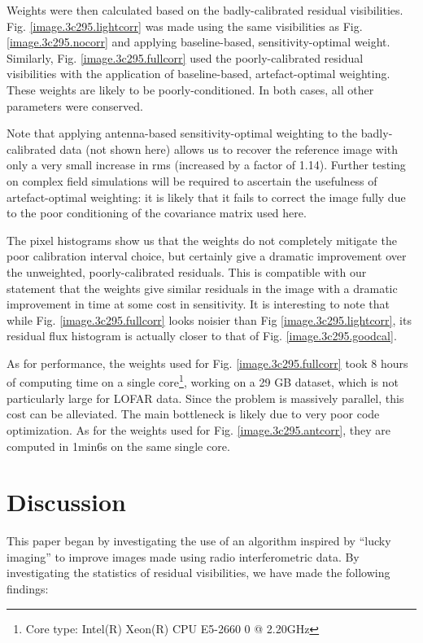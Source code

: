 \pg
Weights were then calculated based on the badly-calibrated residual visibilities. Fig. \ref{image.3c295.lightcorr} was made using the same visibilities as Fig. \ref{image.3c295.nocorr} and applying baseline-based, sensitivity-optimal weight. Similarly, Fig. \ref{image.3c295.fullcorr} used the poorly-calibrated residual visibilities with the application of baseline-based, artefact-optimal weighting. These weights are likely to be poorly-conditioned. In both cases, all other parameters were conserved.


\pg
Note that applying antenna-based sensitivity-optimal weighting to the badly-calibrated data (not shown here) allows us to recover the reference image with only a very small increase in rms (increased by a factor of 1.14). Further testing on complex field simulations will be required to ascertain the usefulness of artefact-optimal weighting: it is likely that it fails to correct the image fully due to the poor conditioning of the covariance matrix used here.

\pg
{The pixel histograms show us that the weights do not completely mitigate the poor calibration interval choice, but certainly give a dramatic improvement over the unweighted, poorly-calibrated residuals. This is compatible with our statement that the weights give similar residuals in the image with a dramatic improvement in time at some cost in sensitivity. It is interesting to note that while Fig. \ref{image.3c295.fullcorr} looks noisier than Fig \ref{image.3c295.lightcorr}, its residual flux histogram is actually closer to that of Fig. \ref{image.3c295.goodcal}.}

\pg
As for performance, the weights used for Fig. \ref*{image.3c295.fullcorr} took 8 hours of computing time on a single core\footnote{Core type: Intel(R) Xeon(R) CPU E5-2660 0 @ 2.20GHz}, working on a 29 GB dataset, which is not particularly large for LOFAR data. Since the problem is massively parallel, this cost can be alleviated. The main bottleneck is likely due to very poor code optimization. As for the weights used for Fig. \ref*{image.3c295.antcorr}, they are computed in 1min6s on the same single core. 


\section{Discussion}

This paper began by investigating the use of an algorithm inspired by ``lucky imaging'' to improve images made using radio interferometric data. By investigating the statistics of residual visibilities, we have made the following findings:

